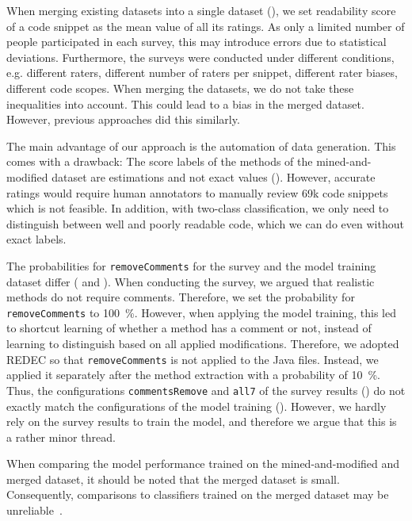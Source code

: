 \documentclass[%
class=scrreprt,
chapterprefix=false,%
open=right,%
twoside=false,%
paper=a4,%
logofile={Logo\_zentral\_farbig\_EN.png},%
thesistype=master,%
UKenglish,%
]{se2thesis}
\theoremstyle{definition}
\newcommand{\citeolddataset}{\cite{buse2009learning, dorn2012general, scalabrino2018comprehensive}\xspace}
\newcommand{\numSamples}{69k\xspace}
\newcommand{\rdh}{REDEC\xspace}
\begin{document}
	When merging existing datasets \citeolddataset into a single dataset (), we set readability score of a code snippet as the mean value of all its ratings. As only a limited number of people participated in each survey, this may introduce errors due to statistical deviations.
	Furthermore, the surveys were conducted under different conditions, e.g. different raters, different number of raters per snippet, different rater biases, different code scopes. When merging the datasets, we do not take these inequalities into account. This could lead to a bias in the merged dataset. However, previous approaches did this similarly.
	
	The main advantage of our approach is the automation of data generation.
	This comes with a drawback: The score labels of the methods of the mined-and-modified dataset are estimations and not exact values (). However, accurate ratings would require human annotators to manually review \numSamples code snippets which is not feasible. In addition, with two-class classification, we only need to distinguish between well and poorly readable code, which we can do even without exact labels.
	
	The probabilities for \texttt{removeComments} for the survey and the model training dataset differ ( and ). When conducting the survey, we argued that realistic methods do not require comments. Therefore, we set the probability for \texttt{removeComments} to 100~\%. However, when applying the model training, this led to shortcut learning of whether a method has a comment or not, instead of learning to distinguish based on all applied modifications. Therefore, we adopted \rdh so that \texttt{removeComments} is not applied to the Java files. Instead, we applied it separately after the method extraction with a probability of 10~\%.
	Thus, the configurations \texttt{commentsRemove} and \texttt{all7} of the survey results () do not exactly match the configurations of the model training ().
	However, we hardly rely on the survey results to train the model, and therefore we argue that this is a rather minor thread.
	
	When comparing the model performance trained on the mined-and-modified and merged dataset, it should be noted that the merged dataset is small. Consequently, comparisons to classifiers trained on the merged dataset may be unreliable~\cite{mi2022towards}.
	
\end{document}
